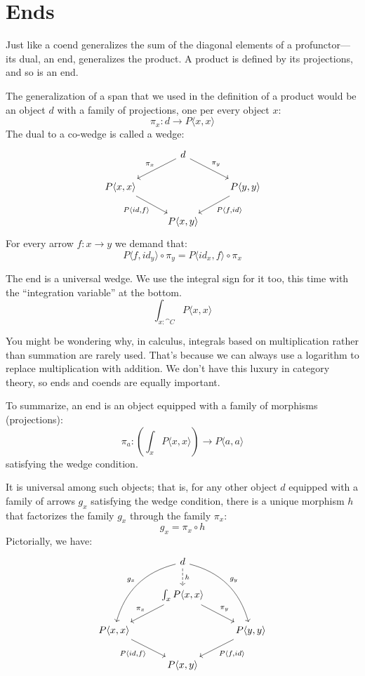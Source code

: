 \documentclass[DaoFP]{subfiles}
\begin{document}
\section{Ends}

Just like a coend generalizes the sum of the diagonal elements of a profunctor---its dual, an end, generalizes the product. A product is defined by its projections, and so is an end. 

The generalization of a span that we used in the definition of a product would be an object $d$ with a family of projections, one per every object $x$:
\[ \pi_x \colon d \to P \langle x, x \rangle \]
The dual to a co-wedge is called a wedge:
\[
 \begin{tikzcd}
 &d
 \arrow[ld, "\pi_x"']
 \arrow[rd, "\pi_y"]
 \\
 P \langle x, x \rangle
 \arrow[dr, "{P \langle id, f \rangle}"']
 &&P \langle y, y \rangle
 \arrow[dl, "{P \langle f, id \rangle}"]
 \\
 & P \langle x, y \rangle
 \end{tikzcd}
\]
For every arrow $f \colon x \to y$ we demand that:
\[ P \langle f, id_y \rangle \circ \pi_y = P \langle id_x, f \rangle \circ \pi_x \]

The end is a universal wedge. We use the integral sign for it too, this time with the ``integration variable'' at the bottom. 
\[ \int_{x \colon \cat C} P \langle x, x \rangle \]

You might be wondering why, in calculus, integrals based on multiplication rather than summation are rarely used. That's because we can always use a logarithm to replace multiplication with addition. We don't have this luxury in category theory, so ends and coends are equally important.

To summarize, an end is an object equipped with a family of morphisms (projections):
\[ \pi_a \colon \left( \int_x P \langle x, x \rangle \right) \to P \langle a, a \rangle \]
satisfying the wedge condition. 

It is universal among such objects; that is, for any other object $d$ equipped with a family of arrows $g_x$ satisfying the wedge condition, there is a unique morphism $h$ that factorizes the family $g_x$ through the family $\pi_x$:
\[ g_x = \pi_x \circ h \]
Pictorially, we have:
\[
 \begin{tikzcd}
 &d
 \arrow[ddl, bend right, "g_x"']
 \arrow[ddr, bend left, "g_y"]
 \arrow[d, dashed, "h"]
 \\
 & \int_x P \langle x, x \rangle
 \arrow[ld, "\pi_x"']
 \arrow[rd, "\pi_y"]
 \\
 P \langle x, x \rangle
 \arrow[dr, "{P \langle id, f \rangle}"']
 &&P \langle y, y \rangle
 \arrow[dl, "{P \langle f, id \rangle}"]
 \\
 & P \langle x, y \rangle
 \end{tikzcd}
\]
\end{document}
